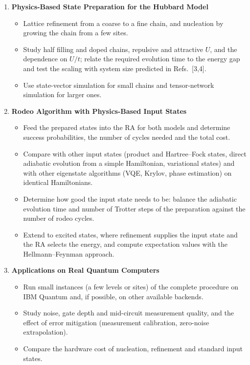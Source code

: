 \documentclass[12pt,a4paper]{article}
\begin{document}
\begin{enumerate}
\item \textbf{Physics-Based State Preparation for the Hubbard Model}
  \begin{itemize}
    \item Lattice refinement from a coarse to a fine chain, and nucleation by growing the chain from a few sites.
    \item Study half filling and doped chains, repulsive and attractive $U$, and the dependence on $U/t$; relate the required evolution time to the energy gap and test the scaling with system size predicted in Refs.~[3,4].
    \item Use state-vector simulation for small chains and tensor-network simulation for larger ones.
  \end{itemize}

\item \textbf{Rodeo Algorithm with Physics-Based Input States}
  \begin{itemize}
    \item Feed the prepared states into the RA for both models and determine success probabilities, the number of cycles needed and the total cost.
    \item Compare with other input states (product and Hartree--Fock states, direct adiabatic evolution from a simple Hamiltonian, variational states) and with other eigenstate algorithms (VQE, Krylov, phase estimation) on identical Hamiltonians.
    \item Determine how good the input state needs to be: balance the adiabatic evolution time and number of Trotter steps of the preparation against the number of rodeo cycles.
    \item Extend to excited states, where refinement supplies the input state and the RA selects the energy, and compute expectation values with the Hellmann--Feynman approach.
  \end{itemize}

\item \textbf{Applications on Real Quantum Computers}
  \begin{itemize}
    \item Run small instances (a few levels or sites) of the complete procedure on IBM Quantum and, if possible, on other available backends.
    \item Study noise, gate depth and mid-circuit measurement quality, and the effect of error mitigation (measurement calibration, zero-noise extrapolation).
    \item Compare the hardware cost of nucleation, refinement and standard input states.
  \end{itemize}


\end{enumerate}
\end{document}
